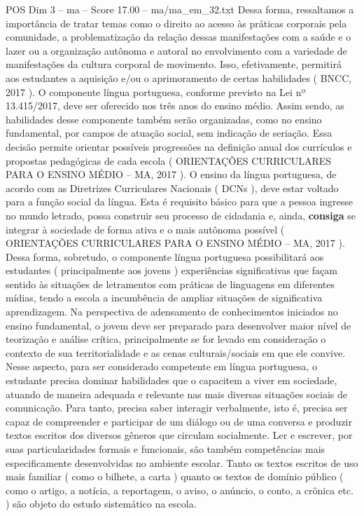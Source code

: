 \begin{textsample}{POS Dim 3 – ma – Score 17.00 – ma/ma\_em\_32.txt}
Dessa forma, ressaltamos a importância de tratar temas como o direito ao acesso às práticas corporais pela comunidade, a problematização da relação dessas manifestações com a saúde e o lazer ou a organização autônoma e autoral no envolvimento com a variedade de manifestações da cultura corporal de movimento.
Isso, efetivamente, permitirá aos estudantes a aquisição e/ou o aprimoramento de certas habilidades ( BNCC, 2017 ).
O componente língua portuguesa, conforme previsto na Lei nº 13.415/2017, deve ser oferecido nos três anos do ensino médio.
Assim sendo, as habilidades desse componente também serão organizadas, como no ensino fundamental, por campos de atuação social, sem indicação de seriação.
Essa decisão permite orientar possíveis progressões na definição anual dos currículos e propostas pedagógicas de cada escola ( ORIENTAÇÕES CURRICULARES PARA O ENSINO MÉDIO – MA, 2017 ).
O ensino da língua portuguesa, de acordo com as Diretrizes Curriculares Nacionais ( DCNs ), deve estar voltado para a função social da língua.
Esta é requisito básico para que a pessoa ingresse no mundo letrado, possa construir seu processo de cidadania e, ainda, \textbf{consiga} se integrar à sociedade de forma ativa e o mais autônoma possível ( ORIENTAÇÕES CURRICULARES PARA O ENSINO MÉDIO – MA, 2017 ).
Dessa forma, sobretudo, o componente língua portuguesa possibilitará aos estudantes ( principalmente aos jovens ) experiências significativas que façam sentido às situações de letramentos com práticas de linguagens em diferentes mídias, tendo a escola a incumbência de ampliar situações de significativa aprendizagem.
Na perspectiva de adensamento de conhecimentos iniciados no ensino fundamental, o jovem deve ser preparado para desenvolver maior nível de teorização e análise crítica, principalmente se for levado em consideração o contexto de sua territorialidade e as cenas culturais/sociais em que ele convive.
Nesse aspecto, para ser considerado competente em língua portuguesa, o estudante precisa dominar habilidades que o capacitem a viver em sociedade, atuando de maneira adequada e relevante nas mais diversas situações sociais de comunicação.
Para tanto, precisa saber interagir verbalmente, isto é, precisa ser capaz de compreender e participar de um diálogo ou de uma conversa e produzir textos escritos dos diversos gêneros que circulam socialmente.
Ler e escrever, por suas particularidades formais e funcionais, são também competências mais especificamente desenvolvidas no ambiente escolar.
Tanto os textos escritos de uso mais familiar ( como o bilhete, a carta ) quanto os textos de domínio público ( como o artigo, a notícia, a reportagem, o aviso, o anúncio, o conto, a crônica etc. ) são objeto do estudo sistemático na escola.

\end{textsample}
